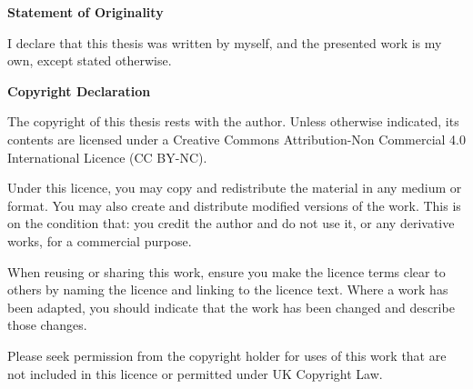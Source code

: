 \cleardoublepage

\begin{center}{
  \large \bf Statement of Originality}
\end{center}

I declare that this thesis was written by myself, and the presented work is my own, except
stated otherwise.


\begin{center}{
  \large \bf Copyright Declaration}
\end{center}

The copyright of this thesis rests with the author. Unless otherwise indicated, its contents are licensed under a Creative Commons Attribution-Non Commercial 4.0 International Licence (CC BY-NC).

Under this licence, you may copy and redistribute the material in any medium or format. You may also create and distribute modified versions of the work. This is on the condition that: you credit the author and do not use it, or any derivative works, for a commercial purpose. 

When reusing or sharing this work, ensure you make the licence terms clear to others by naming the licence and linking to the licence text. Where a work has been adapted, you should indicate that the work has been changed and describe those changes.

Please seek permission from the copyright holder for uses of this work that are not included in this licence or permitted under UK Copyright Law.